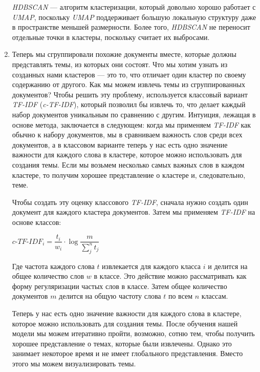 \begin{enumerate}
\textit{HDBSCAN} --- алгоритм кластеризации, который довольно хорошо работает с 
\textit{UMAP}, поскольку \textit{UMAP} поддерживает большую локальную структуру даже в пространстве меньшей размерности. Более того, \textit{HDBSCAN} не переносит отдельные точки в кластеры, поскольку считает их выбросами.

\item Теперь мы сгруппировали похожие документы вместе, которые должны представлять темы, из которых они состоят. Что мы хотим узнать из созданных нами кластеров --- это то, что отличает один кластер по своему содержанию от другого.  Как мы можем извлечь темы из сгруппированных документов? Чтобы решить эту проблему, используется классовый вариант 
\textit{TF-IDF} (\textit{c-TF-IDF}), который позволил бы извлечь то, что делает каждый набор документов уникальным по сравнению с другим. Интуиция, лежащая в основе метода, заключается в следующем: когда мы применяем \textit{TF-IDF} как обычно к набору документов, мы в сравниваем важность слов среди всех документов, а в классовом варианте теперь у нас есть одно значение важности для каждого слова в кластере, которое можно использовать для создания темы. Если мы возьмем несколько  самых важных слов в каждом кластере, то получим хорошее представление о кластере и, следовательно, теме.

Чтобы создать эту оценку классового \textit{TF-IDF}, сначала нужно создать один документ для каждого кластера документов.
Затем мы применяем \textit{TF-IDF} на основе классов:

\begin{center}
$\textit{c-TF-IDF}_{i} = 
\dfrac{t_i}{w_i} \cdot 
\log{
\dfrac{m}{\sum\limits_j^n t_j}}$
\end{center}

Где частота каждого слова $t$ извлекается для каждого класса $i$ и делится на общее количество слов $w$ в классе. Это действие можно рассматривать как форму регуляризации частых слов в классе. Затем общее количество документов $m$ делится на общую частоту слова $t$ по всем $n$ классам.

Теперь у нас есть одно значение важности для каждого слова в кластере, которое можно использовать для создания темы. После обучения нашей модели мы можем итеративно пройти, возможно, сотню тем, чтобы получить хорошее представление о темах, которые были извлечены. Однако это занимает некоторое время и не имеет глобального представления. Вместо этого мы можем визуализировать темы. 

\end{enumerate}

